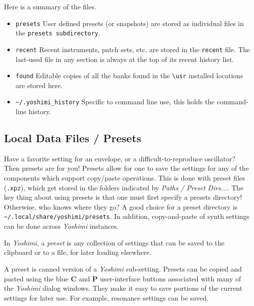    Here is a summary of the files.

\begin{itemize}
    \item \texttt{presets}
        User defined presets (or snapshots) are stored as individual files in
        the \texttt{presets subdirectory}.
   \item \texttt{recent}
         Recent instruments, patch sets, etc. are stored in the \texttt{recent}
         file. The last-used file in any section is always at the top of its
         recent history list.
    \item \texttt{found}
        Editable copies of all the banks found in the \texttt{\textbackslash usr}
        installed locations are stored here.
    \item \texttt{\textasciitilde/.yoshimi\_history}
         Specific to command line use, this holds the command-line history.
\end{itemize}

\subsection{Local Data Files / Presets}
\label{subsec:local_data_preset}

   Have a favorite setting for an envelope, or a difficult-to-reproduce
   oscillator? Then presets are for you! Presets allow for one to save the
   settings for any of the components which support copy/paste operations.
   This is done with preset files (\texttt{.xpz}), which get stored in the
   folders indicated by \textsl{Paths / Preset Dirs...}.
   The key thing about using presets is that one must first
   specify a presets directory!  Otherwise, who knows where they go?
   A good choice for a preset directory is
   \texttt{\textasciitilde/.local/share/yoshimi/presets}.
   In addition, copy-and-paste of synth settings can be done across
   \textsl{Yoshimi} instances.

   In \textsl{Yoshimi}, a
   \textsl{preset} is any collection of settings that can be saved to the
   clipboard or to a file, for later loading elsewhere.

   A preset is canned version of a \textsl{Yoshimi} sub-setting.  Presets can be
   copied and pasted using the blue \textbf{C} and \textbf{P} user-interface
   buttons associated with many of the \textsl{Yoshimi} dialog windows.  They
   make it easy to save portions of the current settings for later use.  For
   example, resonance settings can be saved.

